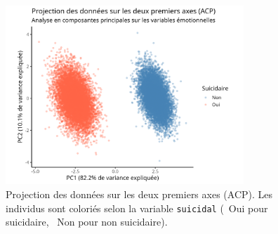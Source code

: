 \begin{figure}[H]
	\centering
	\includegraphics[width=0.8\textwidth]{images/pca_plot.png}
	\caption{Projection des données sur les deux premiers axes (ACP). 
		Les individus sont coloriés selon la variable \texttt{suicidal} 
		(\og\, Oui \fg{} pour suicidaire, \og\, Non \fg{} pour non suicidaire).}
	\label{fig:pca-plot}
\end{figure}




